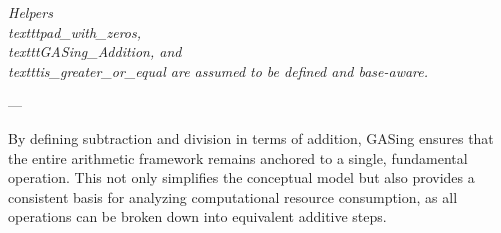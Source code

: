 \emph{Helpers \\texttt{pad\_with\_zeros}, \\texttt{GASing\_Addition}, and \\texttt{is\_greater\_or\_equal} are assumed to be defined and base-aware.}

---

By defining subtraction and division in terms of addition, GASing ensures that the entire arithmetic framework remains anchored to a single, fundamental operation. This not only simplifies the conceptual model but also provides a consistent basis for analyzing computational resource consumption, as all operations can be broken down into equivalent additive steps.
